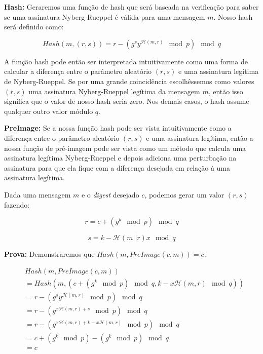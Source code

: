 \documentclass[a4paper]{article}
\begin{document}
    \textbf{Hash: } Geraremos uma função de hash que será baseada na
    verificação para saber se uma assinatura Nyberg-Rueppel é válida para
    uma mensagem $m$. Nosso hash será definido como:
    
    $$
    Hash(m, (r, s)) = r - (g^sy^{\mathcal{H}(m, r)} \mod p) \mod q
    $$
    
    A função hash pode então ser interpretada intuitivamente como uma
    forma de calcular a diferença entre o parâmetro aleatório $(r, s)$ e
    uma assinatura legítima de Nyberg-Rueppel. Se por uma grande
    coincidência escolhêssemos como valores $(r, s)$ uma assinatura
    Nyberg-Rueppel legítima da mensagem $m$, então isso significa que o
    valor de nosso hash seria zero. Nos demais casos, o hash assume
    qualquer outro valor módulo $q$.
    
    
    \textbf{PreImage:} Se a nossa função hash pode ser vista
    intuitivamente como a diferença entre o parâmetro aleatório $(r, s)$ e
    uma assinatura legítima, então a nossa função de pré-imagem pode ser
    vista como um método que calcula uma assinatura legítima
    Nyberg-Rueppel e depois adiciona uma perturbação na assinatura para
    que ela fique com a diferença desejada em relação à uma assinatura legítima.
    
    Dada uma mensagem $m$ e o \textit{digest} desejado $c$, podemos gerar
    um valor $(r, s)$ fazendo:
    
    $$
    r = c + (g^k \mod p) \mod q
    $$
    
    $$
    s = k-\mathcal{H}(m||r)x \mod q
    $$
    
    \textbf{Prova: }Demonstraremos que $Hash(m, PreImage(c, m)) = c$.
    
    \begin{equation*}
      \begin{split}
        &Hash(m, PreImage(c, m))\\
        &= Hash(m, (c+(g^k \mod p) \mod q, k-x\mathcal{H}(m, r) \mod q))\\
        &= r - (g^sy^{\mathcal{H}(m, r)} \mod p) \mod q\\
        &= r - (g^{x\mathcal{H}(m, r) + s} \mod p) \mod q\\
        &= r - (g^{x\mathcal{H}(m, r) + k - x\mathcal{H}(m, r)} \mod p) \mod q\\
        &= c+ (g^k \mod p) - (g^{k} \mod p) \mod q\\
        &= c\\
      \end{split}
    \end{equation*}
    
\end{document}
